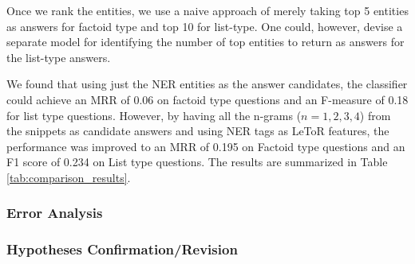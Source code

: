 Once we rank the entities, we use a naive approach of merely taking top 5 entities as answers for factoid type and top 10 for list-type. One could, however, devise a separate model for identifying the number of top entities to return as answers for the list-type answers. 

We found that using just the NER entities as the answer candidates, the classifier could achieve an MRR of 0.06 on factoid type questions and an F-measure of 0.18 for list type questions. However, by having all the n-grams ($n = 1, 2, 3, 4$) from the snippets as candidate answers and using NER tags as LeToR features, the performance was improved to an MRR of 0.195 on Factoid type questions and an F1 score of 0.234  on List type questions. The results are summarized in Table \ref{tab:comparison_results}.


\subsubsection{Error Analysis}

\subsubsection{Hypotheses Confirmation/Revision}



